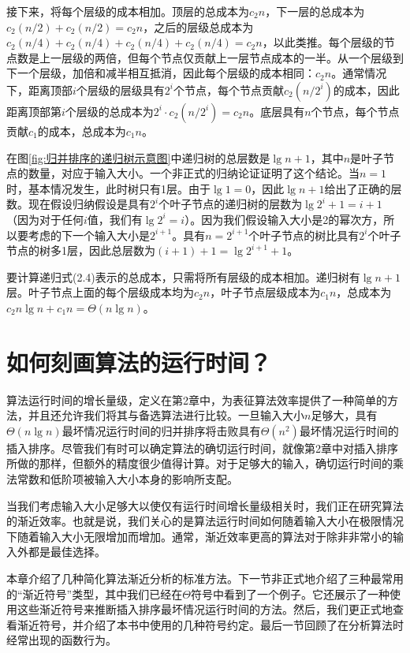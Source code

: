 \documentclass[lang=cn,newtx,10pt,scheme=chinese]{elegantbook}
\begin{document}
接下来，将每个层级的成本相加。顶层的总成本为$c_2n$，下一层的总成本为$c_2(n / 2)+c_2(n / 2)=c_2 n$，之后的层级总成本为$c_2(n / 4)+c_2(n / 4)+c_2(n / 4)+c_2(n / 4)=c_2 n$，以此类推。每个层级的节点数是上一层级的两倍，但每个节点仅贡献上一层节点成本的一半。从一个层级到下一个层级，加倍和减半相互抵消，因此每个层级的成本相同：$c_2n$。通常情况下，距离顶部$i$个层级的层级具有$2^i$个节点，每个节点贡献$c_2(n/2^i)$的成本，因此距离顶部第$i$个层级的总成本为$2^i \cdot c_2\left(n / 2^i\right)=c_2 n$。底层具有$n$个节点，每个节点贡献$c_1$的成本，总成本为$c_1n$。

在图\ref{fig:归并排序的递归树示意图}中递归树的总层数是$\lg n+1$，其中$n$是叶子节点的数量，对应于输入大小。一个非正式的归纳论证证明了这个结论。当$n=1$时，基本情况发生，此时树只有1层。由于$\lg 1 = 0$，因此$\lg n + 1$给出了正确的层数。现在假设归纳假设是具有$2^i$个叶子节点的递归树的层数为$\lg 2^i+1=i+1$（因为对于任何$i$值，我们有$\lg 2^i=i$）。因为我们假设输入大小是2的幂次方，所以要考虑的下一个输入大小是$2^{i+1}$。具有$n=2^{i+1}$个叶子节点的树比具有$2^i$个叶子节点的树多1层，因此总层数为$(i+1)+1=\lg{2^{i+1}}+1$。

要计算递归式(2.4)表示的总成本，只需将所有层级的成本相加。递归树有$\lg n + 1$层。叶子节点上面的每个层级成本均为$c_2n$，叶子节点层级成本为$c_1n$，总成本为$c_2 n \lg n + c_1 n = \Theta(n \lg n)$。

\chapter{如何刻画算法的运行时间？}

算法运行时间的增长量级，定义在第2章中，为表征算法效率提供了一种简单的方法，并且还允许我们将其与备选算法进行比较。一旦输入大小$n$足够大，具有$\Theta(n\lg n)$最坏情况运行时间的归并排序将击败具有$\Theta(n^2)$最坏情况运行时间的插入排序。尽管我们有时可以确定算法的确切运行时间，就像第2章中对插入排序所做的那样，但额外的精度很少值得计算。对于足够大的输入，确切运行时间的乘法常数和低阶项被输入大小本身的影响所支配。

当我们考虑输入大小足够大以使仅有运行时间增长量级相关时，我们正在研究算法的渐近效率。也就是说，我们关心的是算法运行时间如何随着输入大小在极限情况下随着输入大小无限增加而增加。通常，渐近效率更高的算法对于除非非常小的输入外都是最佳选择。

本章介绍了几种简化算法渐近分析的标准方法。下一节非正式地介绍了三种最常用的“渐近符号”类型，其中我们已经在$\Theta$符号中看到了一个例子。它还展示了一种使用这些渐近符号来推断插入排序最坏情况运行时间的方法。然后，我们更正式地查看渐近符号，并介绍了本书中使用的几种符号约定。最后一节回顾了在分析算法时经常出现的函数行为。
\end{document}
